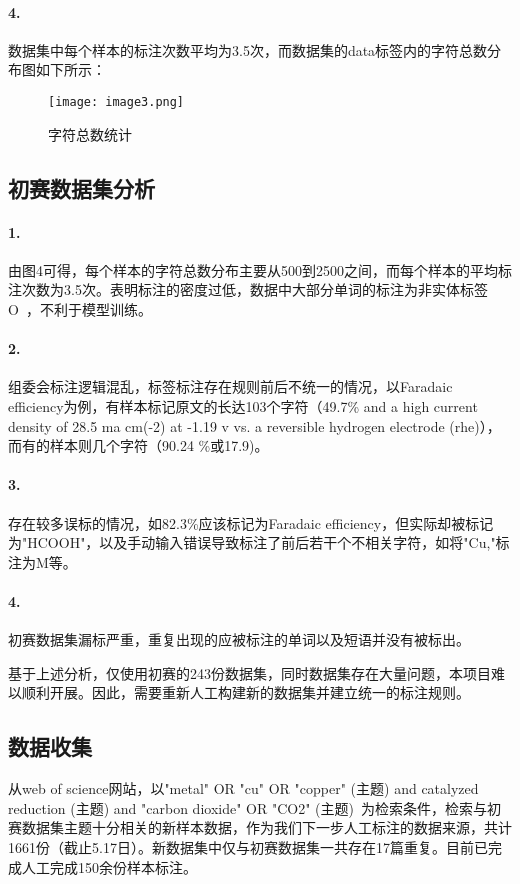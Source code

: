 \documentclass{article}
\begin{document}
\paragraph{4.}数据集中每个样本的标注次数平均为3.5次，而数据集的data标签内的字符总数分布图如下所示：

\begin{figure}[H]
	\centering
    \texttt{[image: image3.png]}
    \caption{字符总数统计}
    \label{fig:count_voacb}
\end{figure}

\subsection{初赛数据集分析}

\paragraph{1.}由图4可得，每个样本的字符总数分布主要从500到2500之间，而每个样本的平均标注次数为3.5次。表明标注的密度过低，数据中大部分单词的标注为非实体标签O ，不利于模型训练。

\paragraph{2.}组委会标注逻辑混乱，标签标注存在规则前后不统一的情况，以Faradaic efficiency为例，有样本标记原文的长达103个字符（49.7\% and a high current density of 28.5 ma cm(-2) at -1.19 v vs. a reversible hydrogen electrode (rhe)），而有的样本则几个字符（90.24 \%或17.9)。


\paragraph{3.}存在较多误标的情况，如82.3\%应该标记为Faradaic efficiency，但实际却被标记为"HCOOH"，以及手动输入错误导致标注了前后若干个不相关字符，如将"Cu,"标注为M等。

\paragraph{4.}初赛数据集漏标严重，重复出现的应被标注的单词以及短语并没有被标出。


基于上述分析，仅使用初赛的243份数据集，同时数据集存在大量问题，本项目难以顺利开展。因此，需要重新人工构建新的数据集并建立统一的标注规则。

\subsection{数据收集}
从web of science网站，以"metal" OR "cu" OR "copper" (主题) and catalyzed reduction (主题) and "carbon dioxide" OR "CO2" (主题) 为检索条件，检索与初赛数据集主题十分相关的新样本数据，作为我们下一步人工标注的数据来源，共计1661份（截止5.17日）。新数据集中仅与初赛数据集一共存在17篇重复。目前已完成人工完成150余份样本标注。
\end{document}
